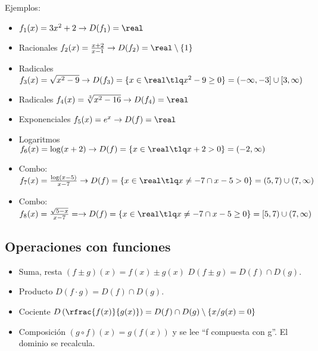 Ejemplos:
\begin{itemize}
	\item $f_1(x) = 3x^2+2 \to D(f_1) = \real$
	\item Racionales $f_2(x) = \frac{x+2}{x-1} \to D(f_2) = \real \setminus\{1\}$
	\item Radicales $f_3(x) = \sqrt{x^2-9} \to D(f_3) = \{x\in\real \tlq x^2-9 \geq 0\} = (-\infty,-3]\cup [3,\infty)$
	\item Radicales $f_4(x) = \sqrt[3]{x^2-16} \to D(f_4) = \real$
	\item Exponenciales $f_5(x) = e^x \to D(f) = \real$
	\item Logaritmos $f_6(x) = \log(x+2) \to D(f) = \{x\in\real\tlq x+2>0\} = (-2,\infty)$
	\item Combo: $f_7(x) = \frac{\log(x-5)}{x-7} \to D(f) = \{x\in\real\tlq x\neq -7 \cap x-5>0\} = (5,7)\cup(7,\infty)$
	\item Combo: $f_{8}(x) = \frac{\sqrt{5-x}}{x-7} =\to D(f) = \{x\in\real\tlq x\neq -7 \cap x-5\geq 0\} = [5,7)\cup(7,\infty)$
\end{itemize}



\subsection{Operaciones con funciones}
\begin{itemize}
	\item Suma, resta $(f\pm g)(x) = f(x) \pm g(x)$
	\subitem $D(f\pm g) = D(f)\cap D(g)$.
	\item Producto
	\subitem $D(f·g) = D(f)\cap D(g)$.
	\item Cociente 
	\subitem $D\left(\rfrac{f(x)}{g(x)}\right) = D(f)\cap D(g) \setminus \{x/g(x) = 0\}$
	\item Composición $(g\circ f)(x) = g\left(f(x)\right)$ y se lee ``f compuesta con g''.
	\subitem El dominio se recalcula.
\end{itemize}


